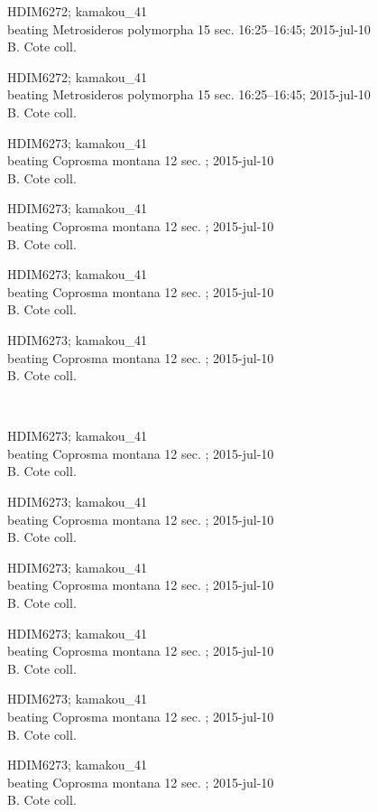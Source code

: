 \documentclass[2pt]{extarticle}
\begin{document}
\noindent
\parbox{0.16\textwidth}{\tiny \raggedright \rule[-0.3\baselineskip]{0pt}{10pt}HDIM6272; kamakou\_41\\ beating Metrosideros polymorpha 15 sec. 16:25--16:45; 2015-jul-10\\ B. Cote coll.}
\parbox{0.16\textwidth}{\tiny \raggedright \rule[-0.3\baselineskip]{0pt}{10pt}HDIM6272; kamakou\_41\\ beating Metrosideros polymorpha 15 sec. 16:25--16:45; 2015-jul-10\\ B. Cote coll.}
\parbox{0.16\textwidth}{\tiny \raggedright \rule[-0.3\baselineskip]{0pt}{10pt}HDIM6273; kamakou\_41\\ beating Coprosma montana 12 sec. ; 2015-jul-10\\ B. Cote coll.}
\parbox{0.16\textwidth}{\tiny \raggedright \rule[-0.3\baselineskip]{0pt}{10pt}HDIM6273; kamakou\_41\\ beating Coprosma montana 12 sec. ; 2015-jul-10\\ B. Cote coll.}
\parbox{0.16\textwidth}{\tiny \raggedright \rule[-0.3\baselineskip]{0pt}{10pt}HDIM6273; kamakou\_41\\ beating Coprosma montana 12 sec. ; 2015-jul-10\\ B. Cote coll.}
\parbox{0.16\textwidth}{\tiny \raggedright \rule[-0.3\baselineskip]{0pt}{10pt}HDIM6273; kamakou\_41\\ beating Coprosma montana 12 sec. ; 2015-jul-10\\ B. Cote coll.} \\ 
\vspace{0.001in} 

\noindent
\parbox{0.16\textwidth}{\tiny \raggedright \rule[-0.3\baselineskip]{0pt}{10pt}HDIM6273; kamakou\_41\\ beating Coprosma montana 12 sec. ; 2015-jul-10\\ B. Cote coll.}
\parbox{0.16\textwidth}{\tiny \raggedright \rule[-0.3\baselineskip]{0pt}{10pt}HDIM6273; kamakou\_41\\ beating Coprosma montana 12 sec. ; 2015-jul-10\\ B. Cote coll.}
\parbox{0.16\textwidth}{\tiny \raggedright \rule[-0.3\baselineskip]{0pt}{10pt}HDIM6273; kamakou\_41\\ beating Coprosma montana 12 sec. ; 2015-jul-10\\ B. Cote coll.}
\parbox{0.16\textwidth}{\tiny \raggedright \rule[-0.3\baselineskip]{0pt}{10pt}HDIM6273; kamakou\_41\\ beating Coprosma montana 12 sec. ; 2015-jul-10\\ B. Cote coll.}
\parbox{0.16\textwidth}{\tiny \raggedright \rule[-0.3\baselineskip]{0pt}{10pt}HDIM6273; kamakou\_41\\ beating Coprosma montana 12 sec. ; 2015-jul-10\\ B. Cote coll.}
\parbox{0.16\textwidth}{\tiny \raggedright \rule[-0.3\baselineskip]{0pt}{10pt}HDIM6273; kamakou\_41\\ beating Coprosma montana 12 sec. ; 2015-jul-10\\ B. Cote coll.} \\ 
\vspace{0.001in} 
\end{document}
